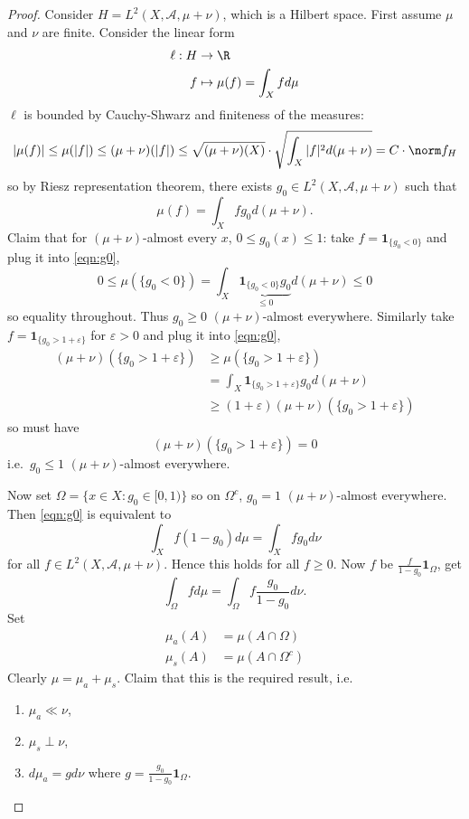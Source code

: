 \documentclass[a4paper]{article}
\begin{document}
\begin{proof}
  Consider \(H = L^2(X, \mathcal A, \mu + \nu)\), which is a Hilbert space. First assume \(\mu\) and \(\nu\) are finite. Consider the linear form
  \begin{align*}
    \ell: H &\to \R \\
    f &\mapsto \mu(f) = \int_X f d\mu
  \end{align*}
  \(\ell\) is bounded by Cauchy-Shwarz and finiteness of the measures:
  \[
    |\mu(f)|
    \leq \mu(|f|)
    \leq (\mu + \nu)(|f|)
    \leq \sqrt{(\mu + \nu)(X)} \cdot \sqrt{\int_X |f|^2 d(\mu + \nu)}
    = C \cdot \norm f_H
  \]
  so by Riesz representation theorem, there exists \(g_0 \in L^2(X, \mathcal A, \mu + \nu)\) such that
  \[
    \label{eqn:g0}
    \mu(f) = \int_X fg_0 d(\mu + \nu).
    \tag{\ast}
  \]
  Claim that for \((\mu + \nu)\)-almost every \(x\), \(0 \leq g_0(x) \leq 1\): take \(f = \mathbf 1_{\{g_0 < 0\}}\) and plug it into \eqref{eqn:g0},
  \[
    0
    \leq \mu(\{g_0 < 0\})
    = \int_X \underbrace{\mathbf 1_{\{g_0 < 0\}} g_0}_{\leq 0} d(\mu + \nu)
    \leq 0
  \]
  so equality throughout. Thus \(g_0 \geq 0\) \((\mu + \nu)\)-almost everywhere. Similarly take \(f = \mathbf 1_{\{g_0 > 1 + \varepsilon\}}\) for \(\varepsilon > 0\) and plug it into \eqref{eqn:g0},
  \begin{align*}
    (\mu + \nu) (\{g_0 > 1 + \varepsilon\})
    &\geq \mu(\{g_0 > 1 + \varepsilon\}) \\
    &= \int_X \mathbf 1_{\{g_0 > 1 + \varepsilon\}} g_0 d(\mu + \nu) \\
    &\geq (1 + \varepsilon) (\mu + \nu)(\{g_0 > 1 + \varepsilon\})
  \end{align*}
  so must have
  \[
    (\mu + \nu) (\{g_0 > 1 + \varepsilon\}) = 0
  \]
  i.e.\ \(g_0 \leq 1\) \((\mu + \nu)\)-almost everywhere.

  Now set \(\Omega = \{x \in X: g_0 \in [0, 1)\}\) so on \(\Omega^c\), \(g_0 = 1\) \((\mu + \nu)\)-almost everywhere. Then \eqref{eqn:g0} is equivalent to
  \[
    \int_X f(1 - g_0) d\mu = \int_X fg_0 d\nu
  \]
  for all \(f \in L^2(X, \mathcal A, \mu + \nu)\). Hence this holds for all \(f \geq 0\). Now \(f\) be \(\frac{f}{1 - g_0} \mathbf 1_\Omega\), get
  \[
    \label{eqn:Radon-Nikodym}
    \int_\Omega f d\mu = \int_\Omega f \frac{g_0}{1 - g_0} d\nu.
    \tag{\ast\ast}
  \]
  Set
  \begin{align*}
    \mu_a(A) &= \mu(A \cap \Omega) \\
    \mu_s(A) &= \mu(A \cap \Omega^c)
  \end{align*}
  Clearly \(\mu = \mu_a + \mu_s\). Claim that this is the required result, i.e.
  \begin{enumerate}
  \item \(\mu_a \ll \nu\),
  \item \(\mu_s \perp \nu\),
  \item \(d\mu_a = gd\nu\) where \(g = \frac{g_0}{1 - g_0} \mathbf 1_\Omega\).
  \end{enumerate}


\end{proof}
\end{document}
